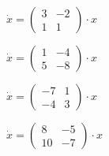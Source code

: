 \begin{multicols}{3}
\begin{enumtasks}
			\item \( \dot{x} = \begin{pmatrix} 3 & -2 \\ 1 & 1 \end{pmatrix} \cdot x \) %
			\item \( \dot{x} = \begin{pmatrix} 1 & -4 \\ 5 & -8 \end{pmatrix} \cdot x \) %
			\item \( \dot{x} = \begin{pmatrix} -7 & 1 \\ -4 & 3 \end{pmatrix} \cdot x \) %
			\item \( \dot{x} = \begin{pmatrix} 8 & -5 \\ 10 & -7 \end{pmatrix} \cdot x \) %

\end{enumtasks}
\end{multicols}

